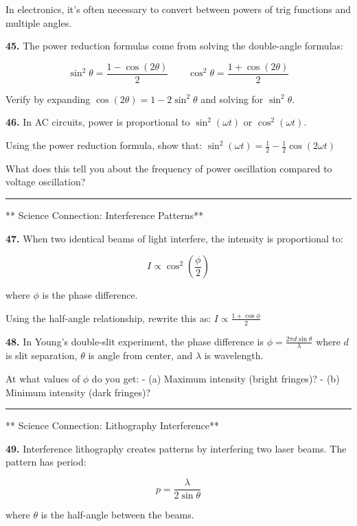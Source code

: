 \documentclass[
  11pt,
]{article}
\begin{document}
In electronics, it's often necessary to convert between powers of trig
functions and multiple angles.

\textbf{45.} The power reduction formulas come from solving the
double-angle formulas:

\[\sin^2\theta = \frac{1 - \cos(2\theta)}{2} \qquad \cos^2\theta = \frac{1 + \cos(2\theta)}{2}\]

Verify by expanding \(\cos(2\theta) = 1 - 2\sin^2\theta\) and solving
for \(\sin^2\theta\).

\textbf{46.} In AC circuits, power is proportional to
\(\sin^2(\omega t)\) or \(\cos^2(\omega t)\).

Using the power reduction formula, show that:
\(\sin^2(\omega t) = \frac{1}{2} - \frac{1}{2}\cos(2\omega t)\)

What does this tell you about the frequency of power oscillation
compared to voltage oscillation?

\begin{center}\rule{0.5\linewidth}{0.5pt}\end{center}

** Science Connection: Interference Patterns**

\textbf{47.} When two identical beams of light interfere, the intensity
is proportional to:

\[I \propto \cos^2\left(\frac{\phi}{2}\right)\]

where \(\phi\) is the phase difference.

Using the half-angle relationship, rewrite this as:
\(I \propto \frac{1 + \cos\phi}{2}\)

\textbf{48.} In Young's double-slit experiment, the phase difference is
\(\phi = \frac{2\pi d \sin\theta}{\lambda}\) where \(d\) is slit
separation, \(\theta\) is angle from center, and \(\lambda\) is
wavelength.

At what values of \(\phi\) do you get: - (a) Maximum intensity (bright
fringes)? - (b) Minimum intensity (dark fringes)?

\begin{center}\rule{0.5\linewidth}{0.5pt}\end{center}

** Science Connection: Lithography Interference**

\textbf{49.} Interference lithography creates patterns by interfering
two laser beams. The pattern has period:

\[p = \frac{\lambda}{2\sin\theta}\]

where \(\theta\) is the half-angle between the beams.
\end{document}
